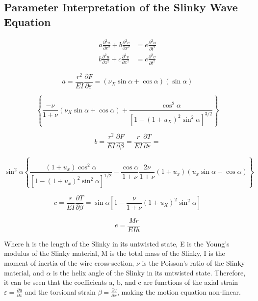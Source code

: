 \documentclass{mcmthesis}  %
\begin{document}
\begin{appendices}
\section{Parameter Interpretation of the Slinky Wave Equation}  %

\begin{align}
a\frac{\partial^2 u}{\partial x^2} + b\frac{\partial^2 v}{\partial x^2} &= e\frac{\partial^2 u}{\partial t^2} \\
b\frac{\partial^2 u}{\partial x^2} + c\frac{\partial^2 v}{\partial x^2} &= e\frac{\partial^2 v}{\partial t^2}
\end{align}

\begin{equation}
a = \frac{r^2}{EI}\frac{\partial F}{\partial \varepsilon} = (\nu_X \sin \alpha + \cos \alpha)(\sin \alpha)
\end{equation}

\begin{equation}
\left\{
\frac{-\nu}{1+\nu}(\nu_X \sin \alpha + \cos \alpha) + \frac{\cos^2 \alpha}{\left[1-(1+u_X)^2\sin^2 \alpha\right]^{3/2}} 
\right\}
\end{equation}

\begin{equation}
b = \frac{r^2}{EI}\frac{\partial F}{\partial \beta} = \frac{r}{EI}\frac{\partial T}{\partial \varepsilon} =
\end{equation}

\begin{equation}
\sin^2 \alpha \left\{
\frac{(1+u_x)\cos^2 \alpha}{\left[1-(1+u_x)^2\sin^2\alpha\right]^{1/2}} - \frac{\cos\alpha}{1+\nu} \frac{2\nu}{1+\nu}(1+u_x)(u_x\sin\alpha+\cos\alpha)
\right\}
\end{equation}

\begin{equation}
c = \frac{r}{EI}\frac{\partial T}{\partial \beta} = \sin\alpha \left[1-\frac{\nu}{1+\nu}(1+u_X)^2\sin^2\alpha\right]
\end{equation}

\begin{equation}
e = \frac{Mr}{EIh}
\end{equation}

Where h is the length of the Slinky in its untwisted state, E is the Young's modulus of the Slinky material, M is the total mass of the Slinky, I is the moment of inertia of the wire cross-section, $\nu$ is the Poisson's ratio of the Slinky material, and $\alpha$ is the helix angle of the Slinky in its untwisted state. Therefore, it can be seen that the coefficients a, b, and c are functions of the axial strain $\varepsilon = \frac{\partial u}{\partial x}$ and the torsional strain $\beta = \frac{\partial v}{\partial x}$, making the motion equation non-linear.


\end{appendices}
\end{document}
